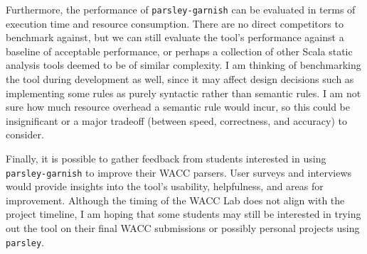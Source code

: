\documentclass[../../main.tex]{subfiles}
\begin{document}
Furthermore, the performance of \texttt{parsley-garnish} can be evaluated in terms of execution time and resource consumption.
There are no direct competitors to benchmark against, but we can still evaluate the tool's performance against a baseline of acceptable performance, or perhaps a collection of other Scala static analysis tools deemed to be of similar complexity.
I am thinking of benchmarking the tool during development as well, since it may affect design decisions such as implementing some rules as purely syntactic rather than semantic rules.
I am not sure how much resource overhead a semantic rule would incur, so this could be insignificant or a major tradeoff (between speed, correctness, and accuracy) to consider.

Finally, it is possible to gather feedback from students interested in using \texttt{parsley-garnish} to improve their WACC parsers.
User surveys and interviews would provide insights into the tool's usability, helpfulness, and areas for improvement.
Although the timing of the WACC Lab does not align with the project timeline, I am hoping that some students may still be interested in trying out the tool on their final WACC submissions or possibly personal projects using \texttt{parsley}.
\end{document}
